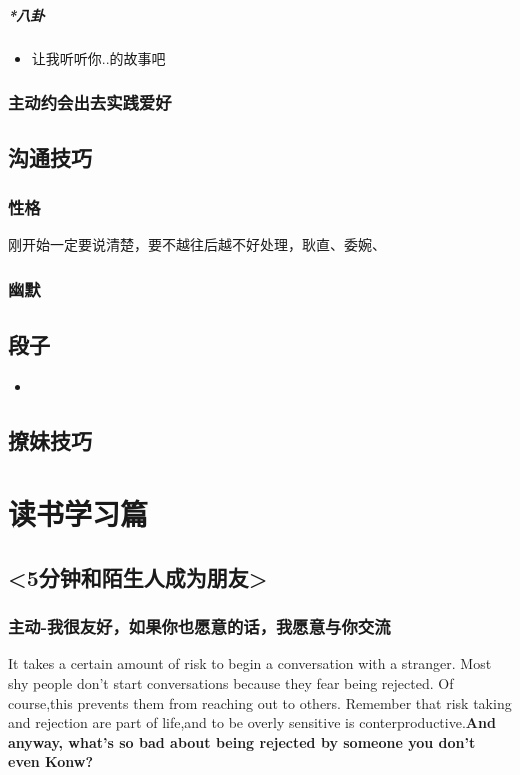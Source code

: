 \documentclass[UTF8,a4paper,8pt]{ctexbook}
\begin{document}
		 \paragraph{*八卦}
			 \begin{itemize}
			 	\item  让我听听你..的故事吧
			 \end{itemize}
	 \subsection{主动约会出去实践爱好}
 \section{沟通技巧}
	\subsection{性格}
		刚开始一定要说清楚，要不越往后越不好处理，耿直、委婉、
	\subsection{幽默} 

 \section{段子}
	 \begin{itemize}
	 	\item 
	 \end{itemize} 
	 	 
 \section{撩妹技巧}

\chapter{读书学习篇}
	\section{<5分钟和陌生人成为朋友>}
		\subsection{主动-我很友好，如果你也愿意的话，我愿意与你交流}
			It takes a certain amount of risk to begin a conversation with a stranger. Most shy people don't start conversations because they fear being rejected. Of course,this prevents them from reaching out to others. Remember that risk taking and rejection are part of life,and to be overly sensitive is conterproductive.\textbf{And anyway, what's so bad about being rejected by someone you don't even Konw?}
			
\end{document}
